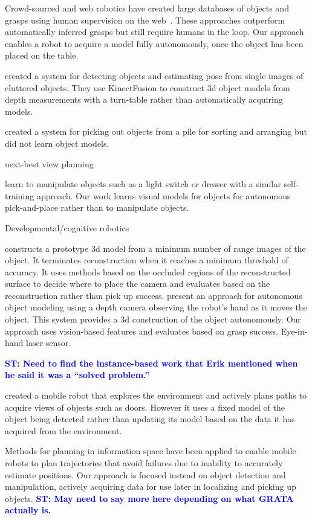 \documentclass{article}
\newcommand{\stnote}[1]{\textcolor{blue}{\textbf{ST: #1}}}
\begin{document}
Crowd-sourced and web robotics have created large databases of objects
and grasps using human supervision on the web~\citep{kent14a, kent14}.
These approaches outperform automatically inferred grasps but still
require humans in the loop.  Our approach enables a robot to acquire a
model fully autonomously, once the object has been placed on the
table.

\citet{zhu14} created a system for detecting objects and estimating
pose from single images of cluttered objects.  They use KinectFusion
to construct 3d object models from depth measurements with a
turn-table rather than automatically acquiring models.

\citet{chang12} created a system for picking out objects from a pile
for sorting and arranging but did not learn object models.  

next-best view planning~\citep{kriegel11}

\citet{nguyen14} learn to manipulate objects such as a light switch or
drawer with a similar self-training approach.  Our work learns visual
models for objects for autonomous pick-and-place rather than to
manipulate objects.

Developmental/cognitive robotics~\citep{lyubova13, kraft10r}

\citet{banta00} constructs a prototype 3d model from a minimum number
of range images of the object.  It terminates reconstruction when it
reaches a minimum threshold of accuracy.  It uses methods based on the
occluded regions of the reconstructed surface to decide where to place
the camera and evaluates based on the reconstruction rather than pick
up success.  \citet{krainin11} present an approach for autonomous
object modeling using a depth camera observing the robot's hand as it
moves the object.  This system provides a 3d construction of the
object autonomously.  Our approach uses vision-based features and
evaluates based on grasp success.  Eye-in-hand laser
sensor.~\citep{aeotti14}

\stnote{Need to find the instance-based work that Erik mentioned when
  he said it was a ``solved problem.''}

\citet{velez11} created a mobile robot that explores the environment
and actively plans paths to acquire views of objects such as doors.
However it uses a fixed model of the object being detected rather than
updating its model based on the data it has acquired from the
environment.

Methods for planning in information space \citep{he08, atanasov13,
  prentice09} have been applied to enable mobile robots to plan
trajectories that avoid failures due to inability to accurately
estimate positions.  Our approach is focused instead on
object detection and manipulation, actively acquiring data for use
later in localizing and picking up objects. \stnote{May need to say
  more here depending on what GRATA actually is.}
\end{document}

